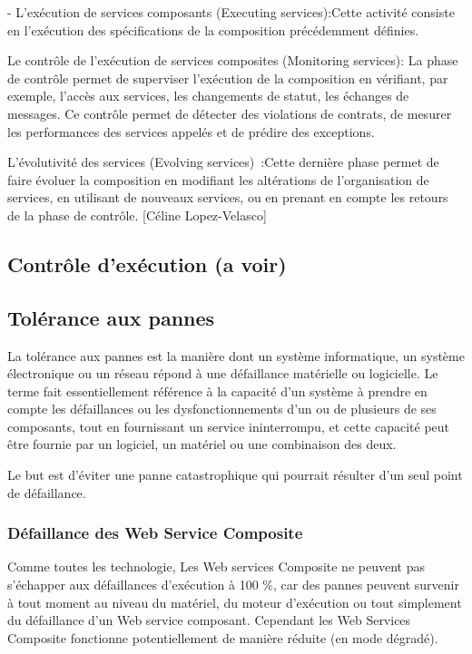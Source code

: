 - L’exécution de services composants (Executing services):Cette activité consiste en l’exécution des spécifications de la composition précédemment définies. 


Le contrôle de l’exécution de services composites (Monitoring services): La phase de contrôle permet de superviser l’exécution de la composition en vérifiant, par exemple, l’accès aux services, les changements de statut, les échanges de messages. Ce contrôle permet de détecter des violations de contrats, de mesurer les performances des services appelés et de prédire des exceptions. 


L’évolutivité des services (Evolving services) :Cette dernière phase permet de faire évoluer la composition en modifiant les altérations de l’organisation de services, en utilisant de nouveaux  services, ou en prenant en compte les retours de la phase de contrôle. 
[Céline Lopez-Velasco]



\subsection{ Contrôle d'exécution (a voir) }



\subsection{ Tolérance aux pannes}

La tolérance aux pannes est la manière dont un système informatique, un système électronique ou un réseau répond à une défaillance matérielle ou logicielle. Le terme fait essentiellement référence à la capacité d'un système à prendre en compte les défaillances ou les dysfonctionnements d’un ou de plusieurs de ses composants, tout en fournissant un service ininterrompu, et cette capacité peut être fournie par un logiciel, un matériel ou une combinaison des deux.

Le but est d'éviter une panne catastrophique qui pourrait résulter d'un seul point de défaillance. 

\subsubsection{Défaillance des Web Service Composite}

Comme toutes les technologie, Les Web services Composite ne peuvent pas s’échapper aux défaillances d’exécution à 100 \%, car des pannes peuvent survenir à tout moment au niveau du matériel, du moteur d’exécution ou tout simplement du défaillance d’un Web service composant.
Cependant les Web Services Composite fonctionne potentiellement de manière réduite (en mode dégradé).


